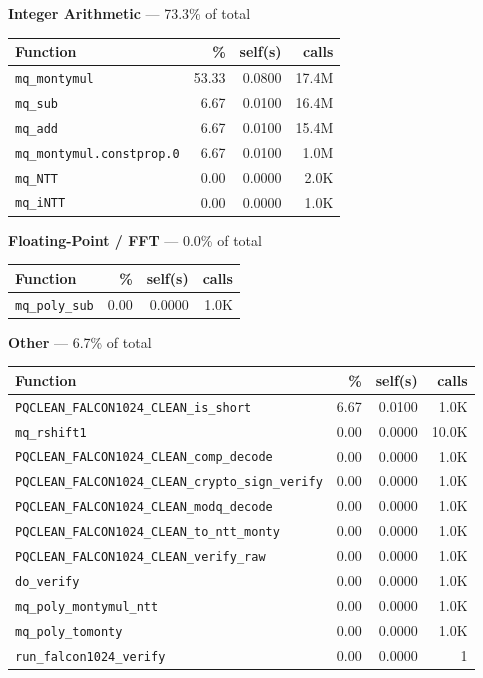 \documentclass[11pt,a4paper]{article}
\begin{document}
\noindent\colorbox{intcolor}{\strut \textbf{Integer Arithmetic} --- 73.3\% of total}
\vspace{2pt}

\begin{longtable}{p{7.5cm}rrr}
\toprule
Function & \% & self(s) & calls \\
\midrule
\endhead
  \texttt{mq\_montymul} & 53.33 & 0.0800 & 17.4M \\
  \texttt{mq\_sub} & 6.67 & 0.0100 & 16.4M \\
  \texttt{mq\_add} & 6.67 & 0.0100 & 15.4M \\
  \texttt{mq\_montymul.constprop.0} & 6.67 & 0.0100 & 1.0M \\
  \texttt{mq\_NTT} & 0.00 & 0.0000 & 2.0K \\
  \texttt{mq\_iNTT} & 0.00 & 0.0000 & 1.0K \\
\bottomrule
\end{longtable}

\noindent\colorbox{fpcolor}{\strut \textbf{Floating-Point / FFT} --- 0.0\% of total}
\vspace{2pt}

\begin{longtable}{p{7.5cm}rrr}
\toprule
Function & \% & self(s) & calls \\
\midrule
\endhead
  \texttt{mq\_poly\_sub} & 0.00 & 0.0000 & 1.0K \\
\bottomrule
\end{longtable}

\noindent\colorbox{othercolor}{\strut \textbf{Other} --- 6.7\% of total}
\vspace{2pt}

\begin{longtable}{p{7.5cm}rrr}
\toprule
Function & \% & self(s) & calls \\
\midrule
\endhead
  \texttt{PQCLEAN\_FALCON1024\_CLEAN\_is\_short} & 6.67 & 0.0100 & 1.0K \\
  \texttt{mq\_rshift1} & 0.00 & 0.0000 & 10.0K \\
  \texttt{PQCLEAN\_FALCON1024\_CLEAN\_comp\_decode} & 0.00 & 0.0000 & 1.0K \\
  \texttt{PQCLEAN\_FALCON1024\_CLEAN\_crypto\_sign\_verify} & 0.00 & 0.0000 & 1.0K \\
  \texttt{PQCLEAN\_FALCON1024\_CLEAN\_modq\_decode} & 0.00 & 0.0000 & 1.0K \\
  \texttt{PQCLEAN\_FALCON1024\_CLEAN\_to\_ntt\_monty} & 0.00 & 0.0000 & 1.0K \\
  \texttt{PQCLEAN\_FALCON1024\_CLEAN\_verify\_raw} & 0.00 & 0.0000 & 1.0K \\
  \texttt{do\_verify} & 0.00 & 0.0000 & 1.0K \\
  \texttt{mq\_poly\_montymul\_ntt} & 0.00 & 0.0000 & 1.0K \\
  \texttt{mq\_poly\_tomonty} & 0.00 & 0.0000 & 1.0K \\
  \texttt{run\_falcon1024\_verify} & 0.00 & 0.0000 & 1 \\
\bottomrule
\end{longtable}
\end{document}
